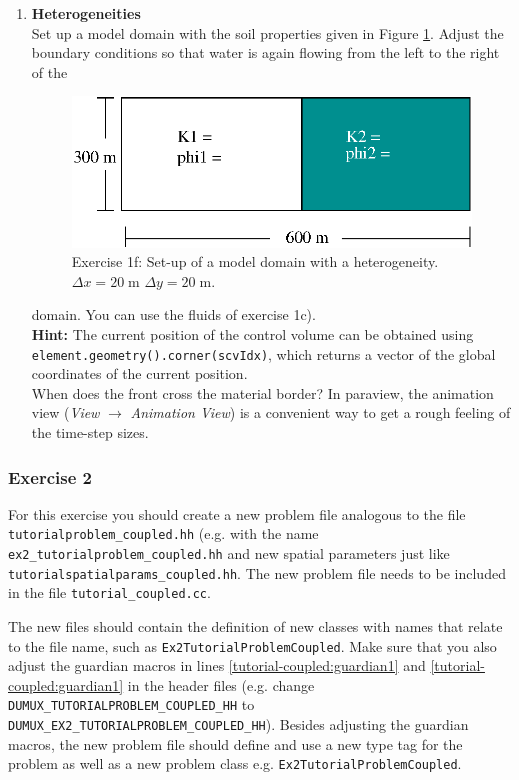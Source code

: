 \begin{enumerate}
\item \textbf{Heterogeneities}  \\
  Set up a model domain with the soil properties given in Figure
  \ref{tutorial-coupled:exercise1_d}. Adjust the boundary conditions
  so that water is again flowing from the left to the right of the
\begin{figure}[ht]
\centering
\includegraphics[width=0.5\linewidth,keepaspectratio]{EPS/exercise1_c.eps}
\caption{Exercise 1f: Set-up of a model domain with a heterogeneity. $\Delta x = 20 \;\text{m}$ $\Delta y = 20\;\text{m}$.}\label{tutorial-coupled:exercise1_d}
\end{figure}
domain. You can use the fluids of exercise 1c).\\
\textbf{Hint:} The current position of the control volume can be obtained using \texttt{element\allowbreak.geometry()\allowbreak.corner(scvIdx)}, which
returns a vector of the global coordinates of the current position.\\
When does the front cross the material border? In paraview, the
animation view (\textit{View} $\rightarrow$ \textit{Animation
  View}) is a convenient way to get a rough feeling of the time-step
sizes.
\end{enumerate}

\subsubsection{Exercise 2}
For this exercise you should create a new problem file analogous to
the file \texttt{tutorialproblem\_coupled.hh} (e.g. with the name
\texttt{ex2\_tutorialproblem\_coupled.hh} and new spatial parameters
just like \texttt{tutorialspatialparams\_coupled.hh}. The new
problem file needs to
be included in the file \texttt{tutorial\_coupled.cc}.

The new files should contain the definition of new classes with names
that relate to the file name, such as
\texttt{Ex2TutorialProblemCoupled}. Make sure that you also adjust the
guardian macros in lines \ref{tutorial-coupled:guardian1} and
\ref{tutorial-coupled:guardian1}
in the header files (e.g. change
\mbox{\texttt{DUMUX\_TUTORIALPROBLEM\_COUPLED\_HH}} to\\
\mbox{\texttt{DUMUX\_EX2\_TUTORIALPROBLEM\_COUPLED\_HH}}). 
Besides adjusting the guardian macros, the new problem file should define and
use a new type tag for the problem as well as a new problem class
e.g. \mbox{\texttt{Ex2TutorialProblemCoupled}}.


